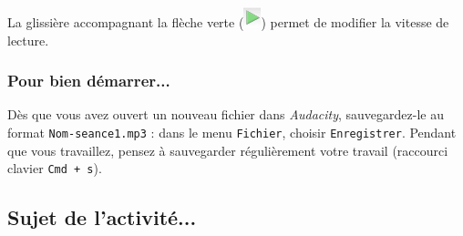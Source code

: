 \begin{itemize}


La glissière accompagnant la flèche verte (\includegraphics[angle=0,width=.4cm]{./images/son01/fleche_verte}) permet de modifier la vitesse de lecture.

\end{itemize}



\subsubsection{Pour bien démarrer...}

Dès que vous avez ouvert un nouveau fichier dans \emph{Audacity}, sauvegardez-le au format \texttt{Nom-seance1.mp3} : dans le menu \texttt{Fichier}, choisir \texttt{Enregistrer}. Pendant que vous travaillez, pensez à sauvegarder régulièrement votre travail (raccourci clavier \texttt{Cmd + s}).   



\subsection{Sujet de l'activité...}

